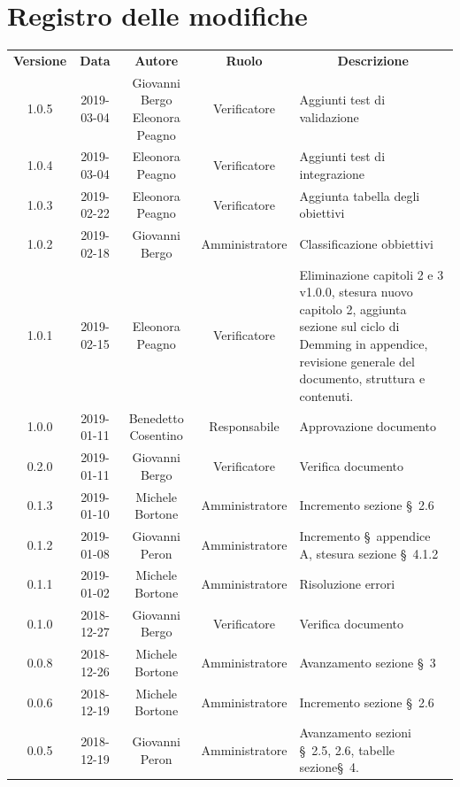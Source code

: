 \documentclass[11pt,a4paper]{article}
\begin{document}
	
	\newpage
	\section*{\centering Registro delle modifiche}
	\begin{tabularx}{\textwidth}{ c | c | c | c | X }
		\rowcolor{LightBlue}
		\color{white}\bfseries Versione & \color{white}\bfseries Data & \color{white}\bfseries Autore & \color{white}\bfseries Ruolo & \multicolumn{1}{c}{\color{white}\bfseries Descrizione}\\[0.25cm]
		1.0.5 & 2019-03-04 & Giovanni Bergo Eleonora Peagno & Verificatore & Aggiunti test di validazione \\ \hline
		1.0.4 & 2019-03-04 & Eleonora Peagno & Verificatore & Aggiunti test di integrazione \\ \hline
		1.0.3 & 2019-02-22 & Eleonora Peagno & Verificatore & Aggiunta tabella degli obiettivi \\ \hline
		1.0.2 & 2019-02-18 & Giovanni Bergo & Amministratore & Classificazione obbiettivi\\ \hline
		1.0.1 & 2019-02-15 & Eleonora Peagno & Verificatore & Eliminazione capitoli 2 e 3 v1.0.0, stesura nuovo capitolo 2, aggiunta sezione sul ciclo di Demming in appendice, revisione generale del documento, struttura e contenuti. \\ \hline
		1.0.0 & 2019-01-11 & Benedetto Cosentino & Responsabile & Approvazione documento\\ \hline
		0.2.0 & 2019-01-11 & Giovanni Bergo & Verificatore & Verifica documento\\ \hline
		0.1.3 & 2019-01-10 & Michele Bortone & Amministratore & Incremento sezione \S\ 2.6\\ \hline
		0.1.2 & 2019-01-08 & Giovanni Peron & Amministratore & Incremento \S\ appendice A, stesura sezione \S\  4.1.2\\ \hline
		0.1.1 & 2019-01-02 & Michele Bortone & Amministratore & Risoluzione errori\\ \hline
		0.1.0 & 2018-12-27 & Giovanni Bergo & Verificatore & Verifica documento\\ \hline
		0.0.8 & 2018-12-26 & Michele Bortone & Amministratore & Avanzamento sezione \S\ 3\\ \hline
		0.0.6 & 2018-12-19 & Michele Bortone & Amministratore & Incremento sezione \S\ 2.6\\ \hline
		0.0.5 & 2018-12-19 & Giovanni Peron & Amministratore & Avanzamento sezioni \S\  2.5, 2.6, tabelle sezione\S\ 4.\\ \hline

\end{tabularx}
\end{document}
